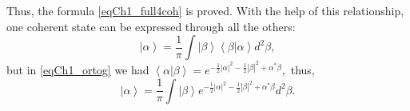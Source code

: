 Thus, the formula \eqref{eqCh1_full4coh} is proved. With the help of this relationship, one coherent state can be expressed through all the others: 
\[
\left|\alpha\right> = \frac{1}{\pi}\int\left|\beta\right>\left<\beta\right|\left.\alpha\right> d^2 \beta,
\]
but in \eqref{eqCh1_ortog} we had
\(
\left<\alpha\right|\left.\beta\right> = 
e^{
-\frac{1}{2} \left|\alpha\right|^2  -\frac{1}{2} \left|\beta\right|^2
+
\alpha^{*} \beta
},
\)
thus,
\begin{equation}
\left|\alpha\right> = \frac{1}{\pi}\int\left|\beta\right>
e^{
-\frac{1}{2} \left|\alpha\right|^2  -\frac{1}{2} \left|\beta\right|^2
+
\alpha^{*} \beta
} d^2 \beta.
\end{equation}